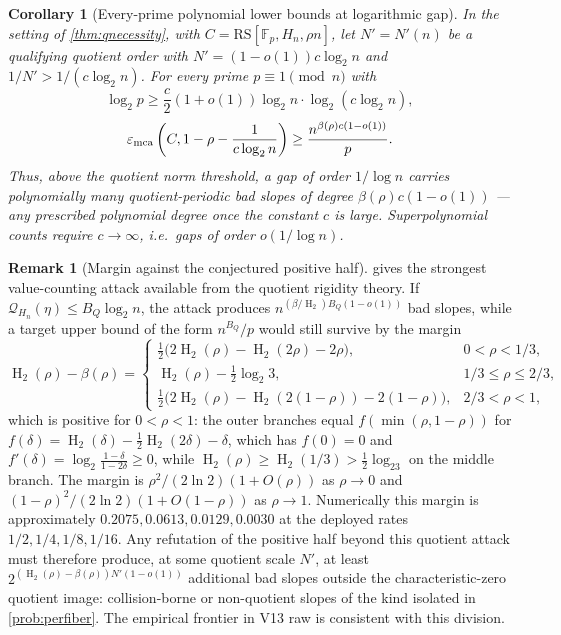 \documentclass[11pt]{article}
\newtheorem{corollary}[corollary]{Corollary}
\theoremstyle{definition}
\newtheorem{remark}[remark]{Remark}
\newcommand{\F}{\mathbb F}
\newcommand{\eps}{\varepsilon}
\newcommand{\HH}{\operatorname{H}_2}
\newcommand{\RS}{\mathrm{RS}}
\newcommand{\emca}{\eps_{\rm mca}}
\begin{document}
\begin{corollary}[Every-prime polynomial lower bounds at logarithmic gap]\label{cor:logfailure}
In the setting of \cref{thm:qnecessity}, with $C=\RS[\F_p,H_n,\rho n]$, let $N'=N'(n)$ be a qualifying quotient order with $N'=(1-o(1))c\log_2 n$ and $1/N'>1/(c\log_2 n)$.  For every prime $p\equiv1\pmod n$ with
\[
        \log_2p\ge \frac c2(1+o(1))\log_2 n\cdot\log_2(c\log_2 n),
\]
\[
        \emca\left(C,1-\rho-\frac1{c\log_2n}\right)
        \ge
        \frac{n^{\beta(\rho)c(1-o(1))}}{p}.
\]
Thus, above the quotient norm threshold, a gap of order $1/\log n$ carries polynomially many quotient-periodic bad slopes of degree $\beta(\rho)c(1-o(1))$ --- any prescribed polynomial degree once the constant $c$ is large.  Superpolynomial counts require $c\to\infty$, i.e.\ gaps of order $o(1/\log n)$.
\end{corollary}

\begin{remark}[Margin against the conjectured positive half]\label{rem:margin}
 gives the strongest value-counting attack available from the quotient rigidity theory.  If $\mathcal Q_{H_n}(\eta)\le B_Q\log_2 n$, the attack produces $n^{(\beta/\HH)B_Q(1-o(1))}$ bad slopes, while a target upper bound of the form $n^{B_Q}/p$ would still survive by the margin
\[
        \HH(\rho)-\beta(\rho)=
        \begin{cases}
        \frac12\bigl(2\HH(\rho)-\HH(2\rho)-2\rho\bigr), & 0<\rho<1/3,\\[1mm]
        \HH(\rho)-\frac12\log_2 3, & 1/3\le\rho\le 2/3,\\[1mm]
        \frac12\bigl(2\HH(\rho)-\HH(2(1-\rho))-2(1-\rho)\bigr), & 2/3<\rho<1,
        \end{cases}
\]
which is positive for $0<\rho<1$: the outer branches equal $f(\min(\rho,1-\rho))$ for $f(\delta)=\HH(\delta)-\frac12\HH(2\delta)-\delta$, which has $f(0)=0$ and $f'(\delta)=\log_2\frac{1-\delta}{1-2\delta}\ge0$, while $\HH(\rho)\ge\HH(1/3)>\frac12\log_23$ on the middle branch.  The margin is $\rho^2/(2\ln2)(1+O(\rho))$ as $\rho\to0$ and $(1-\rho)^2/(2\ln2)(1+O(1-\rho))$ as $\rho\to1$.  Numerically this margin is approximately $0.2075,0.0613,0.0129,0.0030$ at the deployed rates $1/2,1/4,1/8,1/16$.  Any refutation of the positive half beyond this quotient attack must therefore produce, at some quotient scale $N'$, at least $2^{(\HH(\rho)-\beta(\rho))N'(1-o(1))}$ additional bad slopes outside the characteristic-zero quotient image: collision-borne or non-quotient slopes of the kind isolated in \cref{prob:perfiber}.  The empirical frontier in V13 raw is consistent with this division.
\end{remark}
\end{document}
